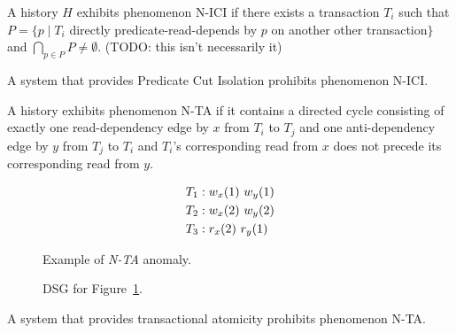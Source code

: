 \begin{definition}
A history $H$ exhibits phenomenon N-ICI if there exists a transaction
$T_i$ such that $P= \{p \mid T_i$ directly predicate-read-depends by
$p$ on another other transaction$\}$ and $\bigcap_{p\in P} P \neq
\emptyset$. (TODO: this isn't necessarily it)
\end{definition}

\begin{definition}
A system that provides Predicate Cut Isolation prohibits phenomenon N-ICI.
\end{definition}

\begin{definition}
A history exhibits phenomenon N-TA if it contains a directed cycle
consisting of exactly one read-dependency edge by $x$ from $T_i$ to
$T_j$ and one anti-dependency edge by $y$ from $T_j$ to $T_i$ and
$T_i$'s corresponding read from $x$ does not precede its corresponding
read from $y$.
\end{definition}


\begin{figure}[H]
\begin{align*}
\small
T_1 &: w_x(1)~w_y(1)\\
T_2 &: w_x(2)~w_y(2)\\
T_3 &: r_x(2)~r_y(1)
\end{align*}
\caption{Example of \textit{N-TA} anomaly.}
\label{fig:nta-history}
\end{figure}

\begin{figure}[H]
\centering
{}
\caption{DSG for Figure~\ref{fig:nta-history}.}
\label{fig:nta-dsg}
\end{figure}

\begin{definition}
A system that provides transactional atomicity prohibits phenomenon
N-TA.
\end{definition}

